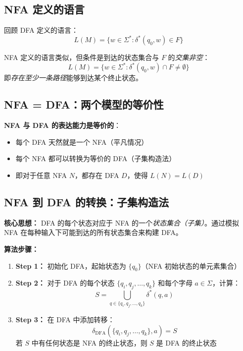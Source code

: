 \documentclass[12pt,a4paper]{ctexart}
\newcommand{\term}[1]{\textbf{\textcolor{mainblue}{#1}}}
\begin{document}
\subsection{NFA 定义的语言}

\begin{keybox}
  回顾 DFA 定义的语言：
  $$L(M) = \{ w \in \Sigma^* : \delta^*(q_0, w) \in F \}$$

  NFA 定义的语言类似，但条件是到达的状态集合与 $F$ 的\emph{交集非空}：
  $$L(M) = \{ w \in \Sigma^* : \delta^*(q_0, w) \cap F \neq \emptyset \}$$
  即\emph{存在至少一条路径}能够到达某个终止状态。
\end{keybox}

\subsection{NFA = DFA：两个模型的等价性}

\begin{keybox}
  \term{NFA 与 DFA 的表达能力是等价的}：
  \begin{itemize}
    \item 每个 DFA 天然就是一个 NFA（平凡情况）
    \item 每个 NFA 都可以转换为等价的 DFA（子集构造法）
    \item 即对于任意 NFA $N$，都存在 DFA $D$，使得 $L(N) = L(D)$
  \end{itemize}
\end{keybox}

\subsection{NFA 到 DFA 的转换：子集构造法}

\begin{keybox}
  \textbf{核心思想：} DFA 的每个状态对应于 NFA 的一个\emph{状态集合（子集）}。通过模拟 NFA 在每种输入下可能到达的所有状态集合来构建 DFA。
\end{keybox}

\textbf{算法步骤：}

\begin{enumerate}[itemsep=0.3em]
  \item \textbf{Step 1：} 初始化 DFA，起始状态为 $\{q_0\}$（NFA 初始状态的单元素集合）
  \item \textbf{Step 2：} 对于 DFA 的每个状态 $\{q_i, q_j, \dots, q_k\}$ 和每个字母 $a \in \Sigma$，计算：
  $$S = \bigcup_{q \in \{q_i, q_j, \dots, q_k\}} \delta^*(q, a)$$
  \item \textbf{Step 3：} 在 DFA 中添加转移：
  $$\delta_{\text{DFA}}(\{q_i, q_j, \dots, q_k\}, a) = S$$
  若 $S$ 中有任何状态是 NFA 的终止状态，则 $S$ 是 DFA 的终止状态
\end{enumerate}
\end{document}
